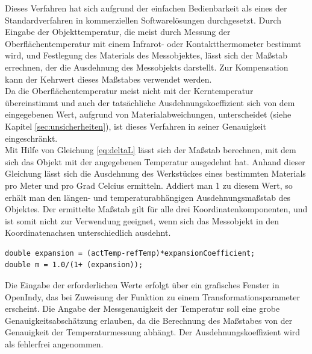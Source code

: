 Dieses Verfahren hat sich aufgrund der einfachen Bedienbarkeit als eines der Standardverfahren in kommerziellen Softwarelösungen durchgesetzt. Durch Eingabe der Objekttemperatur, die meist durch Messung der Oberflächentemperatur mit einem Infrarot- oder Kontaktthermometer bestimmt wird, und Festlegung des Materials des Messobjektes, lässt sich der Maßstab errechnen, der die Ausdehnung des Messobjekts darstellt. Zur Kompensation kann der Kehrwert dieses Maßstabes verwendet werden.\\
Da die Oberflächentemperatur meist nicht mit der Kerntemperatur übereinstimmt und auch der tatsächliche Ausdehnungskoeffizient sich von dem eingegebenen Wert, aufgrund von Materialabweichungen, unterscheidet (siehe Kapitel \ref{sec:unsicherheiten}), ist dieses Verfahren in seiner Genauigkeit eingeschränkt.\\
Mit Hilfe von Gleichung \ref{eq:deltaL} lässt sich der Maßstab berechnen, mit dem sich das Objekt mit der angegebenen Temperatur ausgedehnt hat. Anhand dieser Gleichung lässt sich die Ausdehnung des Werkstückes eines bestimmten Materials pro Meter und pro Grad Celcius ermitteln. Addiert man 1 zu diesem Wert, so erhält man den längen- und temperaturabhängigen Ausdehnungsmaßstab des Objektes. Der ermittelte Maßstab gilt für alle drei Koordinatenkomponenten, und ist somit nicht zur Verwendung geeignet, wenn sich das Messobjekt in den Koordinatenachsen unterschiedlich ausdehnt.
\begin{lstlisting}[caption={Bestimmung der Ausdehnung anhand von Temperatur und Material},captionpos=t]
double expansion = (actTemp-refTemp)*expansionCoefficient;
double m = 1.0/(1+ (expansion));
\end{lstlisting}
Die Eingabe der erforderlichen Werte erfolgt über ein grafisches Fenster in OpenIndy, das bei Zuweisung der Funktion zu einem Transformationsparameter erscheint. Die Angabe der Messgenauigkeit der Temperatur soll eine grobe Genauigkeitsabschätzung erlauben, da die Berechnung des Maßstabes von der Genauigkeit der Temperaturmessung abhängt. Der Ausdehnungskoeffizient wird als fehlerfrei angenommen.
